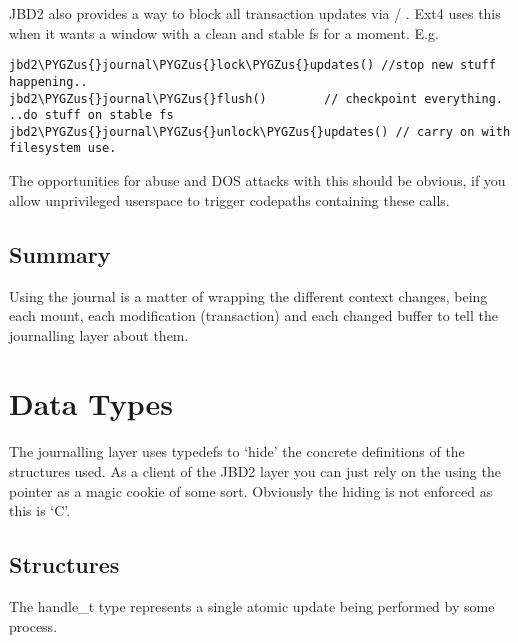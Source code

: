 \documentclass[a4paper,8pt,english]{sphinxmanual}
\def\PYGZus{\char`\_}
\begin{document}
JBD2 also provides a way to block all transaction updates via
{\hyperref[filesystems/index:c.jbd2_journal_lock_updates]{\emph{}}} /
{\hyperref[filesystems/index:c.jbd2_journal_unlock_updates]{\emph{}}}. Ext4 uses this when it wants a
window with a clean and stable fs for a moment. E.g.

\begin{Verbatim}[commandchars=\\\{\}]
jbd2\PYGZus{}journal\PYGZus{}lock\PYGZus{}updates() //stop new stuff happening..
jbd2\PYGZus{}journal\PYGZus{}flush()        // checkpoint everything.
..do stuff on stable fs
jbd2\PYGZus{}journal\PYGZus{}unlock\PYGZus{}updates() // carry on with filesystem use.
\end{Verbatim}

The opportunities for abuse and DOS attacks with this should be obvious,
if you allow unprivileged userspace to trigger codepaths containing
these calls.


\subsection{Summary}
\label{filesystems/index:summary}
Using the journal is a matter of wrapping the different context changes,
being each mount, each modification (transaction) and each changed
buffer to tell the journalling layer about them.


\section{Data Types}
\label{filesystems/index:data-types}
The journalling layer uses typedefs to `hide' the concrete definitions
of the structures used. As a client of the JBD2 layer you can just rely
on the using the pointer as a magic cookie of some sort. Obviously the
hiding is not enforced as this is `C'.


\subsection{Structures}
\label{filesystems/index:structures}

\begin{fulllineitems}
\label{filesystems/index:c.handle_t}
The handle\_t type represents a single atomic update being performed by some process.

\end{fulllineitems}
\end{document}
